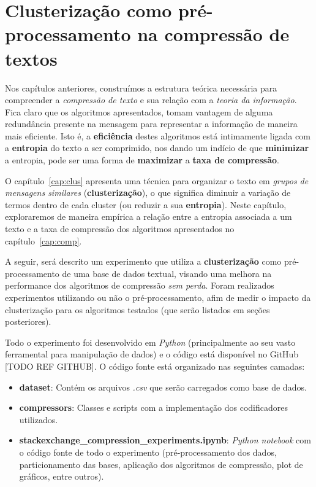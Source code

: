 \chapter{Clusterização como pré-processamento na compressão de textos}
Nos capítulos anteriores, construímos a estrutura teórica necessária para compreender a \emph{compressão de texto} e sua relação com a \emph{teoria da informação}.
Fica claro que os algoritmos apresentados, tomam vantagem de alguma redundância presente na mensagem para representar a informação de maneira mais eficiente.
Isto é, a \textbf{eficiência} destes algoritmos está intimamente ligada com a \textbf{entropia} do texto a ser comprimido,
 nos dando um indício de que \textbf{minimizar} a entropia, pode ser uma forma de \textbf{maximizar} a \textbf{taxa de compressão}.
 
O capítulo~\ref{cap:clus} apresenta uma técnica para organizar o texto em \emph{grupos de mensagens similares} (\textbf{clusterização}), o que significa diminuir a variação de termos dentro de cada cluster (ou reduzir a sua \textbf{entropia}).
Neste capítulo, exploraremos de maneira empírica a relação entre a entropia associada a um texto e a taxa de compressão dos algoritmos apresentados no capítulo~\ref{cap:comp}.

A seguir, será descrito um experimento que utiliza a \textbf{clusterização} como pré-processamento de uma base de dados textual, visando uma melhora na performance dos algoritmos de compressão \emph{sem perda}.
Foram realizados experimentos utilizando ou não o pré-processamento, afim de medir o impacto da clusterização para os algoritmos testados (que serão listados em seções posteriores).

Todo o experimento foi desenvolvido em \emph{Python} (principalmente ao seu vasto ferramental para manipulação de dados) e o código está disponível no GitHub [TODO REF GITHUB].
O código fonte está organizado nas seguintes camadas:
\begin{itemize}
	\item \textbf{dataset}: Contém os arquivos \emph{.csv} que serão carregados como base de dados.
	\item \textbf{compressors}: Classes e scripts com a implementação dos codificadores utilizados.
	\item \textbf{stackexchange\_compression\_experiments.ipynb}: \emph{Python notebook} com o código fonte de todo o experimento (pré-processamento dos dados, particionamento das bases, aplicação dos algoritmos de compressão, plot de gráficos, entre outros).
\end{itemize}
\pagebreak


